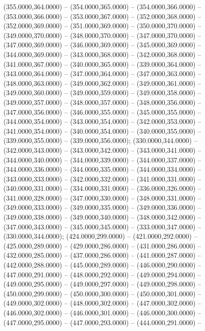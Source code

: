 \begin{scope}[shift={(-231.87,-121.87)}]
\begin{scope}[draw=black,fill=cd7191c,line join=round,line width=0.208pt]
        (355.0000,364.0000) -- (354.0000,365.0000) -- (354.0000,366.0000) --
        (353.0000,366.0000) -- (353.0000,367.0000) -- (352.0000,368.0000) --
        (352.0000,369.0000) -- (351.0000,369.0000) -- (350.0000,370.0000) --
        (349.0000,370.0000) -- (348.0000,370.0000) -- (347.0000,370.0000) --
        (347.0000,369.0000) -- (346.0000,369.0000) -- (345.0000,369.0000) --
        (344.0000,369.0000) -- (343.0000,368.0000) -- (342.0000,368.0000) --
        (341.0000,367.0000) -- (340.0000,365.0000) -- (339.0000,364.0000) --
        (343.0000,364.0000) -- (347.0000,364.0000) -- (347.0000,363.0000) --
        (348.0000,363.0000) -- (349.0000,362.0000) -- (349.0000,361.0000) --
        (349.0000,360.0000) -- (349.0000,359.0000) -- (349.0000,358.0000) --
        (349.0000,357.0000) -- (348.0000,357.0000) -- (348.0000,356.0000) --
        (347.0000,356.0000) -- (346.0000,355.0000) -- (345.0000,355.0000) --
        (344.0000,354.0000) -- (343.0000,354.0000) -- (342.0000,353.0000) --
        (341.0000,354.0000) -- (340.0000,354.0000) -- (340.0000,355.0000) --
        (339.0000,355.0000) -- (339.0000,356.0000);
       (330.0000,344.0000) -- (342.0000,343.0000) --
        (343.0000,342.0000) -- (343.0000,341.0000) -- (344.0000,340.0000) --
        (344.0000,339.0000) -- (344.0000,337.0000) -- (344.0000,336.0000) --
        (344.0000,335.0000) -- (344.0000,334.0000) -- (343.0000,333.0000) --
        (342.0000,332.0000) -- (341.0000,331.0000) -- (340.0000,331.0000) --
        (334.0000,331.0000) -- (336.0000,326.0000) -- (341.0000,328.0000) --
        (347.0000,330.0000) -- (348.0000,331.0000) -- (349.0000,333.0000) --
        (349.0000,335.0000) -- (349.0000,336.0000) -- (349.0000,338.0000) --
        (349.0000,340.0000) -- (348.0000,342.0000) -- (347.0000,343.0000) --
        (345.0000,345.0000) -- (333.0000,347.0000) -- (330.0000,344.0000);
       (424.0000,299.0000) -- (421.0000,292.0000) --
        (425.0000,289.0000) -- (429.0000,286.0000) -- (431.0000,286.0000) --
        (432.0000,285.0000) -- (437.0000,286.0000) -- (441.0000,287.0000) --
        (442.0000,288.0000) -- (445.0000,289.0000) -- (446.0000,290.0000) --
        (447.0000,291.0000) -- (448.0000,292.0000) -- (449.0000,294.0000) --
        (449.0000,295.0000) -- (449.0000,297.0000) -- (449.0000,298.0000) --
        (450.0000,299.0000) -- (450.0000,300.0000) -- (450.0000,301.0000) --
        (449.0000,302.0000) -- (448.0000,302.0000) -- (447.0000,302.0000) --
        (446.0000,302.0000) -- (446.0000,301.0000) -- (446.0000,300.0000) --
        (447.0000,295.0000) -- (447.0000,293.0000) -- (444.0000,291.0000) --

\end{scope}
\end{scope}
